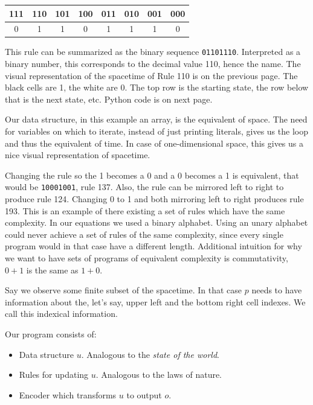 \begin{table}[h!]
\centering
 \begin{tabular}{|c|c|c|c|c|c|c|c|} 
 \hline
 111 & 110 & 101 & 100 & 011 & 010 & 001 & 000 \\ [0.5ex] 
 \hline
 0 & 1 & 1 & 0 & 1 & 1 & 1 & 0 \\ 
 \hline
\end{tabular}
\end{table}

This rule can be summarized as the binary sequence \texttt{01101110}.
Interpreted as a binary number, this corresponds to the decimal value 110, hence the name.
The visual representation of the spacetime of Rule 110 is on the previous page.
The black cells are 1, the white are 0.
The top row is the starting state, the row below that is the next state, etc.
Python code is on next page.

Our data structure, in this example an array, is the equivalent of space.
The need for variables on which to iterate, instead of just printing literals, gives us the loop and thus the equivalent of time.
In case of one-dimensional space, this gives us a nice visual representation of spacetime.

Changing the rule so the 1 becomes a 0 and a 0 becomes a 1 is equivalent, that would be \texttt{10001001}, rule 137.
Also, the rule can be mirrored left to right to produce rule 124.
Changing 0 to 1 and both mirroring left to right produces rule 193.
This is an example of there existing a set of rules which have the same complexity.
In our equations we used a binary alphabet. 
Using an unary alphabet could never achieve a set of rules of the same complexity, since every single program would in that case have a different length.
Additional intuition for why we want to have sets of programs of equivalent complexity is commutativity, $0+1$ is the same as $1+0$.

Say we observe some finite subset of the spacetime.
In that case $p$ needs to have information about the, let's say, upper left and the bottom right cell indexes.
We call this indexical information.

Our program consists of:
\begin{itemize}
\setlength\itemsep{0px}
\item Data structure $u$. Analogous to the \textit{state of the world}.
\item Rules for updating $u$. Analogous to the laws of nature.
\item Encoder which transforms $u$ to output $o$.
\end{itemize}

